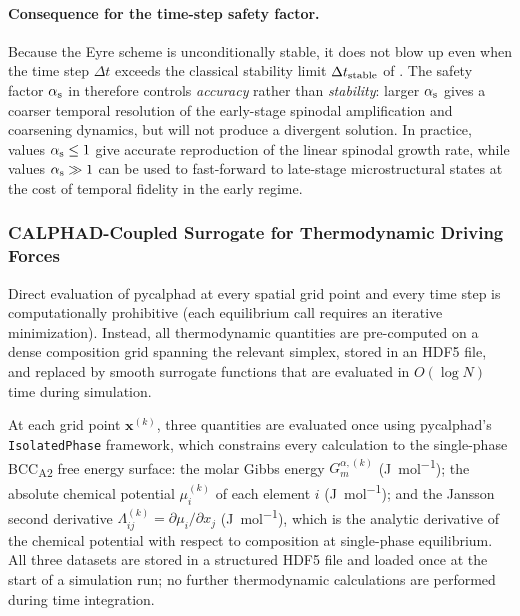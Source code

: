 {\paragraph{Consequence for the time-step safety factor.}

Because the Eyre scheme is unconditionally stable, it does not blow up
even when the time step $\Delta t$ exceeds the classical stability
limit $\Delta t_{\rm stable}$ of .  The safety
factor $\alpha_{\rm s}$ in  therefore controls
\emph{accuracy} rather than \emph{stability}: larger $\alpha_{\rm s}$
gives a coarser temporal resolution of the early-stage spinodal
amplification and coarsening dynamics, but will not produce a
divergent solution.  In practice, values $\alpha_{\rm s} \leq 1$ give
accurate reproduction of the linear spinodal growth rate, while values
$\alpha_{\rm s} \gg 1$ can be used to fast-forward to late-stage
microstructural states at the cost of temporal fidelity in the
early regime.
}

\subsubsection{CALPHAD-Coupled Surrogate for Thermodynamic Driving Forces}
\label{sec:calphad_surrogate}

Direct evaluation of pycalphad at every spatial grid point and every
time step is computationally prohibitive (each equilibrium call
requires an iterative minimization).  Instead, all thermodynamic
quantities are pre-computed on a dense composition grid spanning the
relevant simplex, stored in an HDF5 file, and replaced by smooth
surrogate functions that are evaluated in $O(\log N)$ time during
simulation.

At each grid point $\boldsymbol{x}^{(k)}$, three quantities are
evaluated once using pycalphad's \texttt{IsolatedPhase} framework,
which constrains every calculation to the single-phase
BCC\textsubscript{A2} free energy surface: the molar Gibbs energy
$G^{\alpha,(k)}_m$ (\si{\joule\per\mol}); the absolute chemical
potential $\mu^{(k)}_i$ of each element $i$ (\si{\joule\per\mol});
and the Jansson second derivative
$\Lambda^{(k)}_{ij} = \partial\mu_i/\partial x_j$
\cite{kunselman2024analytically} (\si{\joule\per\mol}), which is
the analytic derivative of the chemical potential with respect to
composition at single-phase equilibrium.  All three datasets are
stored in a structured HDF5 file and loaded once at the start of a
simulation run; no further thermodynamic calculations are performed
during time integration.

